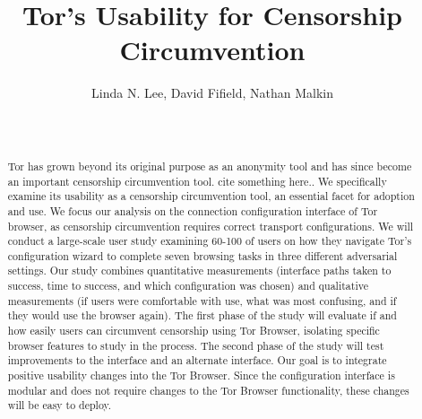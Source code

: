\documentclass{template}
\begin{document}
\title{Tor's Usability for Censorship Circumvention}
\author{
 \alignauthor Linda N. Lee, David Fifield, Nathan Malkin \\
   \vspace{0.5em}
    \\
   \\
}
\maketitle

\begin{abstract}
Tor has grown beyond its original purpose as an anonymity tool and has 
since become an important censorship circumvention tool. {\color {red} cite something here..}
We specifically examine its usability as a censorship circumvention tool,
an essential facet for adoption and use.  
We focus our analysis on the connection configuration interface of Tor browser,
as censorship circumvention requires correct transport configurations.
We will conduct a large-scale user study examining 60-100 of users 
on how they navigate Tor's configuration wizard to complete seven browsing tasks 
in three different adversarial settings. Our study combines quantitative measurements (interface
paths taken to success, time to success, and which configuration was chosen) and
qualitative measurements (if users were comfortable with use, what was most confusing, and 
if they would use the browser again). The first phase of the study will evaluate if and how 
easily users can circumvent censorship using 
Tor Browser, isolating specific browser features to study in the process. The second phase
of the study will test improvements to the interface and an alternate interface. 
Our goal is to integrate positive usability changes into the Tor Browser. Since
the configuration interface is modular and does not require changes to the Tor Browser
functionality, these changes will be easy to deploy. 

\end{abstract}

\end{document}
